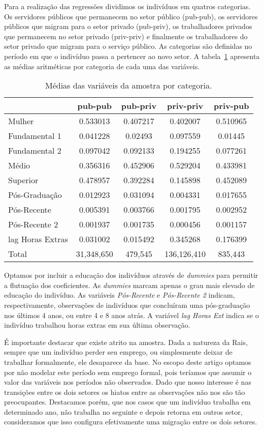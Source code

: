 \documentclass[a4paper]{article}
\begin{document}
Para a realização das regressões dividimos os indivíduos em quatros categorias. Os servidores públicos que permanecem no setor público (pub-pub), os servidores públicos que migram para o setor privado (pub-priv), os trabalhadores privados que permanecem no setor privado (priv-priv) e finalmente os trabalhadores do setor privado que migram para o serviço público. As categorias são definidas no período em que o indivíduo passa a pertencer ao novo setor. A tabela~\ref{tab1} apresenta as médias aritméticas por categoria de cada uma das variáveis.

\begin{table}[H]
\centering
\caption{Médias das variáveis da amostra por categoria.}
\label{tab1}
\begin{tabular}{lcccc}
 & pub-pub & pub-priv & priv-priv & priv-pub \\ \hline
Mulher & 0.533013 & 0.407217 & 0.402007 & 0.510965 \\
Fundamental 1 & 0.041228 & 0.02493 & 0.097559 & 0.01445 \\
Fundamental 2 & 0.097042 & 0.092133 & 0.194255 & 0.077261 \\
Médio & 0.356316 & 0.452906 & 0.529204 & 0.433981 \\
Superior & 0.478957 & 0.392284 & 0.145898 & 0.452089 \\
Pós-Graduação & 0.012923 & 0.031094 & 0.004331 & 0.017655 \\
Pós-Recente & 0.005391 & 0.003766 & 0.001795 & 0.002952 \\
Pós-Recente 2 & 0.001937 & 0.001735 & 0.000456 & 0.001157 \\
lag Horas Extras & 0.031002 & 0.015492 & 0.345268 & 0.176399 \\ \hline
Total & 31,348,650 & 479,545 & 136,126,410 & 835,443
\end{tabular}
\end{table}

Optamos por incluir a educação dos indivíduos através de \textit{dummies} para permitir a flutuação dos coeficientes. As \textit{dummies} marcam apenas o grau mais elevado de educação do indivíduo. As variáveis \textit{Pós-Recente} e \textit{Pós-Recente 2} indicam, respectivamente, observações de indivíduos que concluíram uma pós-graduação nos últimos 4 anos, ou entre 4 e 8 anos atrás. A variável \textit{lag Horas Ext} indica se o indivíduo trabalhou horas extras em sua última observação.

É importante destacar que existe atrito na amostra. Dada a natureza da Rais, sempre que um indivíduo perder seu emprego, ou simplesmente deixar de trabalhar formalmente, ele desaparece da base. No escopo deste artigo optamos por não modelar este período sem emprego formal, pois teríamos que assumir o valor das variáveis nos períodos não observados. Dado que nosso interesse é nas transições entre os dois setores os hiatos entre as observações não nos são tão preocupantes. Destacamos porém, que nos casos que um indivíduo trabalha em determinado ano, não trabalha no seguinte e depois retorna em outros setor, consideramos que isso configura efetivamente uma migração entre os dois setores.
\end{document}
